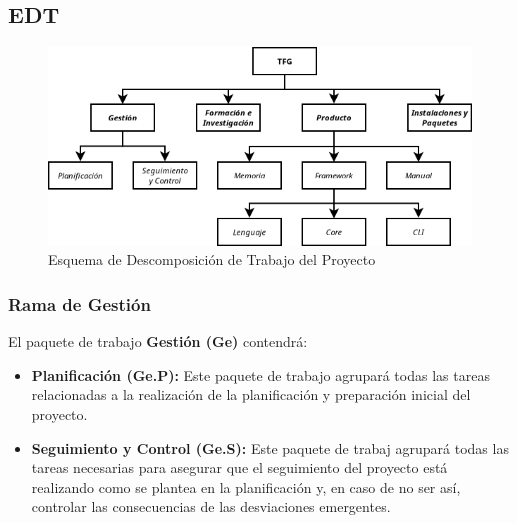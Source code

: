 











\subsection{EDT}\label{subsec:edt}

\begin{figure}[H]
    \centering
    \includegraphics[width=\textwidth]{5-Cuerpo/Chapter1/EDT.png}
    \caption{Esquema de Descomposición de Trabajo del Proyecto}
    \label{fig:EDT}
\end{figure}

\subsubsection{Rama de Gestión}
El paquete de trabajo \textbf{Gestión (Ge)} contendrá:
\begin{itemize}
    \item \textbf{Planificación (Ge.P):} Este paquete de trabajo agrupará todas
    las tareas relacionadas a la realización de la planificación y preparación
    inicial del proyecto.
    \item \textbf{Seguimiento y Control (Ge.S):} Este paquete de trabaj agrupará
    todas las tareas necesarias para asegurar que el seguimiento del proyecto
    está realizando como se plantea en la planificación y, en caso de no ser
    así, controlar las consecuencias de las desviaciones emergentes.
\end{itemize}


